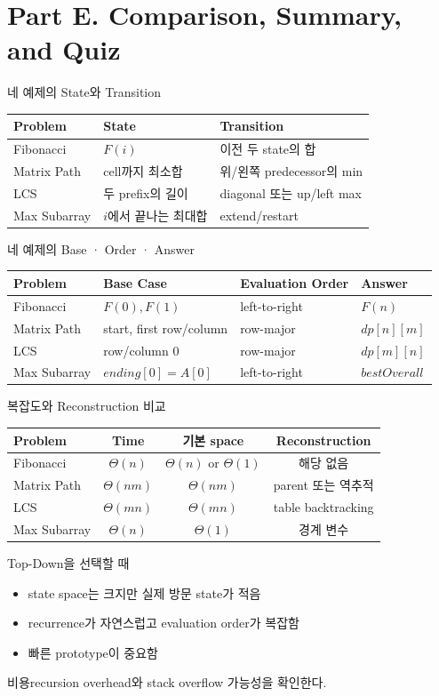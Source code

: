 \section{Part E. Comparison, Summary, and Quiz}
\begin{frame}{네 예제의 State와 Transition}
\small\centering
\renewcommand{\arraystretch}{1.2}
\begin{tabular}{lll}\toprule
Problem&State&Transition\\\midrule
Fibonacci&$F(i)$&이전 두 state의 합\\
Matrix Path&cell까지 최소합&위/왼쪽 predecessor의 min\\
LCS&두 prefix의 길이&diagonal 또는 up/left max\\
Max Subarray&$i$에서 끝나는 최대합&extend/restart\\\bottomrule
\end{tabular}
\end{frame}
\begin{frame}{네 예제의 Base · Order · Answer}
\small\centering
\renewcommand{\arraystretch}{1.18}
\begin{tabular}{llll}\toprule
Problem&Base Case&Evaluation Order&Answer\\\midrule
Fibonacci&$F(0),F(1)$&left-to-right&$F(n)$\\
Matrix Path&start, first row/column&row-major&$dp[n][m]$\\
LCS&row/column 0&row-major&$dp[m][n]$\\
Max Subarray&$ending[0]=A[0]$&left-to-right&$bestOverall$\\\bottomrule
\end{tabular}
\end{frame}
\begin{frame}{복잡도와 Reconstruction 비교}
\small\centering\begin{tabular}{lccc}\toprule
Problem&Time&기본 space&Reconstruction\\\midrule
Fibonacci&$\Theta(n)$&$\Theta(n)$ or $\Theta(1)$&해당 없음\\
Matrix Path&$\Theta(nm)$&$\Theta(nm)$&parent 또는 역추적\\
LCS&$\Theta(mn)$&$\Theta(mn)$&table backtracking\\
Max Subarray&$\Theta(n)$&$\Theta(1)$&경계 변수\\\bottomrule
\end{tabular}
\end{frame}
\begin{frame}{Top-Down을 선택할 때}
\begin{itemize}\item state space는 크지만 실제 방문 state가 적음\item recurrence가 자연스럽고 evaluation order가 복잡함\item 빠른 prototype이 중요함\end{itemize}
\begin{alertblock}{비용}recursion overhead와 stack overflow 가능성을 확인한다.\end{alertblock}
\end{frame}
